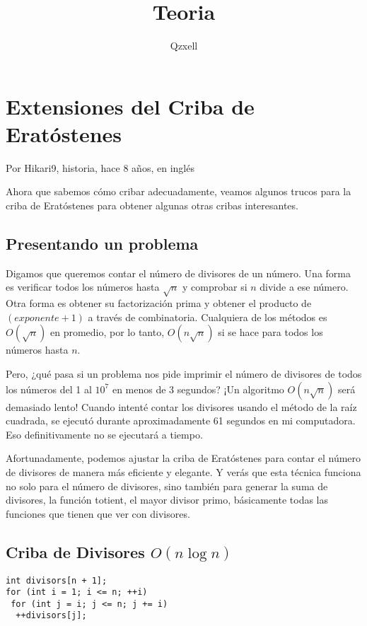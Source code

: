 \documentclass[11pt]{scrartcl}
\author{Qzxell}
\title{Teoria}
\begin{document}
\maketitle

\section{Extensiones del Criba de Eratóstenes}

Por Hikari9, historia, hace 8 años, en inglés

Ahora que sabemos cómo cribar adecuadamente, veamos algunos trucos para la criba de Eratóstenes para obtener algunas otras cribas interesantes.

\subsection*{Presentando un problema}

Digamos que queremos contar el número de divisores de un número. Una forma es verificar todos los números hasta \( \sqrt{n} \) y comprobar si \( n \) divide a ese número. Otra forma es obtener su factorización prima y obtener el producto de \( (exponente + 1) \) a través de combinatoria. Cualquiera de los métodos es \( O(\sqrt{n}) \) en promedio, por lo tanto, \( O(n\sqrt{n}) \) si se hace para todos los números hasta \( n \).

Pero, ¿qué pasa si un problema nos pide imprimir el número de divisores de todos los números del 1 al \( 10^7 \) en menos de 3 segundos? ¡Un algoritmo \( O(n\sqrt{n}) \) será demasiado lento! Cuando intenté contar los divisores usando el método de la raíz cuadrada, se ejecutó durante aproximadamente 61 segundos en mi computadora. Eso definitivamente no se ejecutará a tiempo.

Afortunadamente, podemos ajustar la criba de Eratóstenes para contar el número de divisores de manera más eficiente y elegante. Y verás que esta técnica funciona no solo para el número de divisores, sino también para generar la suma de divisores, la función totient, el mayor divisor primo, básicamente todas las funciones que tienen que ver con divisores.

\subsection*{Criba de Divisores \( O(n \log n) \)}

\begin{verbatim}
int divisors[n + 1];
for (int i = 1; i <= n; ++i)
 for (int j = i; j <= n; j += i)
  ++divisors[j];
\end{verbatim}
\end{document}
